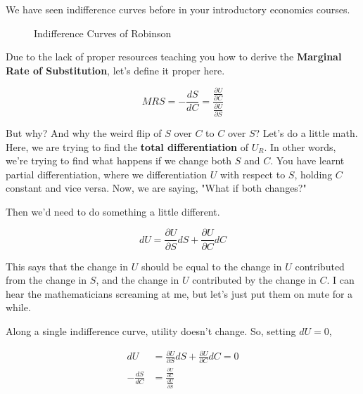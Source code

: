 \documentclass[11pt]{scrartcl}
\begin{document}
We have seen indifference curves before in your introductory economics courses.

\begin{figure}[H]
\centering
{}
\caption{Indifference Curves of Robinson}
\end{figure}

Due to the lack of proper resources teaching you how to derive the \textbf{Marginal Rate of Substitution}, let's define it proper here.

\[MRS = -\frac{dS}{dC} = \frac{\frac{\partial U}{\partial C}}{\frac{\partial U}{\partial S}}\]

But why? And why the weird flip of $S$ over $C$ to $C$ over $S$? Let's do a little math. Here, we are trying to find the \textbf{total differentiation} of $U_R$. In other words, we're trying to find what happens if we change both $S$ and $C$. You have learnt partial differentiation, where we differentiation $U$ with respect to $S$, holding $C$ constant and vice versa. Now, we are saying, "What if both changes?"

Then we'd need to do something a little different. 

\[dU = \frac{\partial U}{\partial S} dS + \frac{\partial U}{\partial C} dC \]

This says that the change in $U$ should be equal to the change in $U$ contributed from the change in $S$, and the change in $U$ contributed by the change in $C$. I can hear the mathematicians screaming at me, but let's just put them on mute for a while.

Along a single indifference curve, utility doesn't change. So, setting $dU = 0$, 

\begin{align*}
dU &= \frac{\partial U}{\partial S} dS + \frac{\partial U}{\partial C} dC = 0 \\
-\frac{dS}{dC} &= \frac{\frac{\partial U}{\partial C}}{\frac{\partial U}{\partial S}}
\end{align*}
\end{document}
